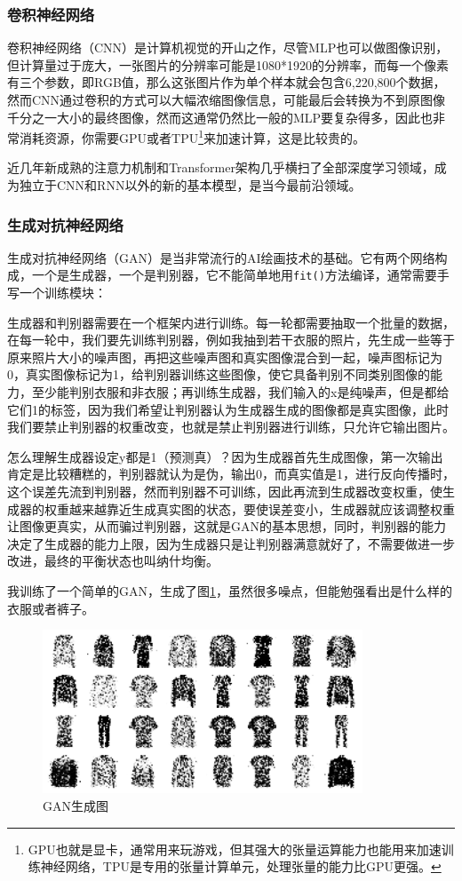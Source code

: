 \documentclass[a5paper, 11pt, openany]{book}
\begin{document}
\subsubsection{卷积神经网络}
卷积神经网络（CNN）是计算机视觉的开山之作，尽管MLP也可以做图像识别，但计算量过于庞大，一张图片的分辨率可能是1080*1920的分辨率，而每一个像素有三个参数，即RGB值，那么这张图片作为单个样本就会包含6,220,800个数据，然而CNN通过卷积的方式可以大幅浓缩图像信息，可能最后会转换为不到原图像千分之一大小的最终图像，然而这通常仍然比一般的MLP要复杂得多，因此也非常消耗资源，你需要GPU或者TPU\footnote{GPU也就是显卡，通常用来玩游戏，但其强大的张量运算能力也能用来加速训练神经网络，TPU是专用的张量计算单元，处理张量的能力比GPU更强。}来加速计算，这是比较贵的。

近几年新成熟的注意力机制和Transformer架构几乎横扫了全部深度学习领域，成为独立于CNN和RNN以外的新的基本模型，是当今最前沿领域。

\subsubsection{生成对抗神经网络}
生成对抗神经网络（GAN）是当非常流行的AI绘画技术的基础。它有两个网络构成，一个是生成器，一个是判别器，它不能简单地用\verb|fit()|方法编译，通常需要手写一个训练模块：

生成器和判别器需要在一个框架内进行训练。每一轮都需要抽取一个批量的数据，在每一轮中，我们要先训练判别器，例如我抽到若干衣服的照片，先生成一些等于原来照片大小的噪声图，再把这些噪声图和真实图像混合到一起，噪声图标记为0，真实图像标记为1，给判别器训练这些图像，使它具备判别不同类别图像的能力，至少能判别衣服和非衣服；再训练生成器，我们输入的x是纯噪声，但是都给它们1的标签，因为我们希望让判别器认为生成器生成的图像都是真实图像，此时我们要禁止判别器的权重改变，也就是禁止判别器进行训练，只允许它输出图片。

怎么理解生成器设定y都是1（预测真）？因为生成器首先生成图像，第一次输出肯定是比较糟糕的，判别器就认为是伪，输出0，而真实值是1，进行反向传播时，这个误差先流到判别器，然而判别器不可训练，因此再流到生成器改变权重，使生成器的权重越来越靠近生成真实图的状态，要使误差变小，生成器就应该调整权重让图像更真实，从而骗过判别器，这就是GAN的基本思想，同时，判别器的能力决定了生成器的能力上限，因为生成器只是让判别器满意就好了，不需要做进一步改进，最终的平衡状态也叫纳什均衡。

我训练了一个简单的GAN，生成了图\ref{GAN生成图}，虽然很多噪点，但能勉强看出是什么样的衣服或者裤子。

\begin{figure}
    \centering
    \includegraphics[width=0.85\textwidth]{figures/GAN生成图.png}
    \caption{GAN生成图}
    \label{GAN生成图}
\end{figure}
\end{document}

